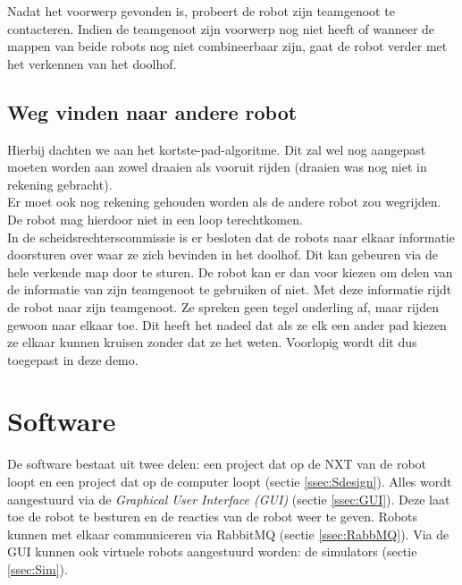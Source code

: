 \documentclass[tt2]{penoverslag}
\begin{document}
Nadat het voorwerp gevonden is, probeert de robot zijn teamgenoot te contacteren. Indien de teamgenoot zijn voorwerp nog niet heeft of wanneer de mappen van beide robots nog niet combineerbaar zijn, gaat de robot verder met het verkennen van het doolhof. \\



\subsection{Weg vinden naar andere robot}
Hierbij dachten we aan het kortste-pad-algoritme. Dit zal wel nog aangepast moeten worden aan zowel draaien als vooruit rijden (draaien was nog niet in rekening gebracht).\\ Er moet ook nog rekening gehouden worden als de andere robot zou wegrijden. De robot mag hierdoor niet in een loop terechtkomen. \\

In de scheidsrechterscommissie is er besloten dat de robots naar elkaar informatie doorsturen over waar ze zich bevinden in het doolhof. Dit kan gebeuren via de hele verkende map door te sturen. De robot kan er dan voor kiezen om delen van de informatie van zijn teamgenoot te gebruiken of niet. Met deze informatie rijdt de robot naar zijn teamgenoot. Ze spreken geen tegel onderling af, maar rijden gewoon naar elkaar toe. Dit heeft het nadeel dat als ze elk een ander pad kiezen ze elkaar kunnen kruisen zonder dat ze het weten. Voorlopig wordt dit dus toegepast in deze demo.\\

\section{Software}
\label{secc:softw}
De software bestaat uit twee delen: een project dat op de NXT van de robot loopt en een project dat op de computer loopt (sectie \ref{ssec:Sdesign}). Alles wordt aangestuurd via de \textit{Graphical User Interface (GUI)} (sectie \ref{ssec:GUI}). Deze laat toe de robot te besturen en de reacties van de robot weer te geven. Robots kunnen met elkaar communiceren via RabbitMQ (sectie \ref{ssec:RabbMQ}). Via de GUI kunnen ook virtuele robots aangestuurd worden: de simulators (sectie \ref{ssec:Sim}).\\
\end{document}
